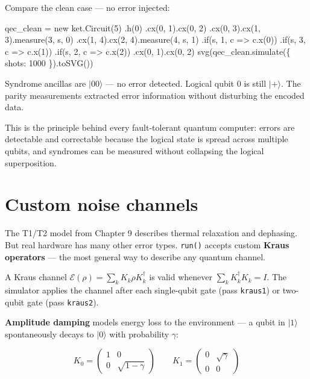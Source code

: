 \documentclass[
  11pt,
  letterpaper,
  oneside]{scrbook}
\newenvironment{Shaded}{\begin{snugshade}}{\end{snugshade}}
\newcommand{\NormalTok}[1]{\textcolor[rgb]{0.00,0.23,0.31}{#1}}
\begin{document}
Compare the clean case --- no error injected:

\begin{Shaded}
\begin{Highlighting}[]
\NormalTok{qec\_clean = new ket.Circuit(5)}
\NormalTok{  .h(0)}
\NormalTok{  .cx(0, 1).cx(0, 2)}
\NormalTok{  .cx(0, 3).cx(1, 3).measure(3, \textquotesingle{}s\textquotesingle{}, 0)}
\NormalTok{  .cx(1, 4).cx(2, 4).measure(4, \textquotesingle{}s\textquotesingle{}, 1)}
\NormalTok{  .if(\textquotesingle{}s\textquotesingle{}, 1, c =\textgreater{} c.x(0))}
\NormalTok{  .if(\textquotesingle{}s\textquotesingle{}, 3, c =\textgreater{} c.x(1))}
\NormalTok{  .if(\textquotesingle{}s\textquotesingle{}, 2, c =\textgreater{} c.x(2))}
\NormalTok{  .cx(0, 1).cx(0, 2)}
\NormalTok{svg(qec\_clean.simulate(\{ shots: 1000 \}).toSVG())}
\end{Highlighting}
\end{Shaded}

Syndrome ancillas are \(|00\rangle\) --- no error detected. Logical
qubit 0 is still \(|+\rangle\). The parity measurements extracted error
information without disturbing the encoded data.

This is the principle behind every fault-tolerant quantum computer:
errors are detectable and correctable because the logical state is
spread across multiple qubits, and syndromes can be measured without
collapsing the logical superposition.

\section{Custom noise channels}\label{custom-noise-channels}

The T1/T2 model from Chapter 9 describes thermal relaxation and
dephasing. But real hardware has many other error types. \texttt{run()}
accepts custom \textbf{Kraus operators} --- the most general way to
describe any quantum channel.

A Kraus channel \(\mathcal{E}(\rho) = \sum_k K_k \rho K_k^\dagger\) is
valid whenever \(\sum_k K_k^\dagger K_k = I\). The simulator applies the
channel after each single-qubit gate (pass \texttt{kraus1}) or two-qubit
gate (pass \texttt{kraus2}).

\textbf{Amplitude damping} models energy loss to the environment --- a
qubit in \(|1\rangle\) spontaneously decays to \(|0\rangle\) with
probability \(\gamma\):

\[K_0 = \begin{pmatrix} 1 & 0 \\ 0 & \sqrt{1-\gamma} \end{pmatrix} \qquad K_1 = \begin{pmatrix} 0 & \sqrt{\gamma} \\ 0 & 0 \end{pmatrix}\]
\end{document}
